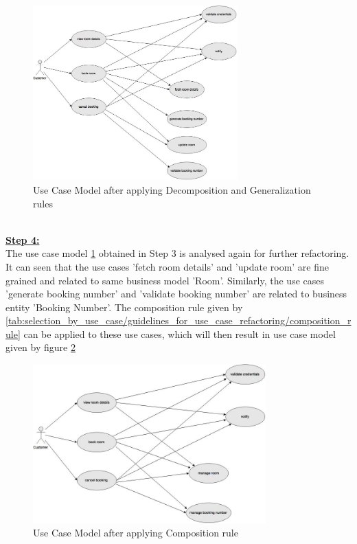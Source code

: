 \\
\begin{figure}[H]
\begin{center}
\includegraphics[width=0.7\textwidth]{figures/use-case-three}
\caption{Use Case Model after applying Decomposition and Generalization rules}
\label{fig:selection_by_use_case/use_case_three}
\end{center}
\end{figure}
\\
\textbf{\underline{Step 4:}}
\\
The use case model \ref{fig:selection_by_use_case/use_case_three} obtained in Step 3 is analysed again for further refactoring. It can seen that the use cases 'fetch room details' and 'update room' are fine grained and related to same business model 'Room'. Similarly, the use cases 'generate booking number' and 'validate booking number' are related to business entity 'Booking Number'. The composition rule given by \ref{tab:selection_by_use_case/guidelines_for_use_case_refactoring/composition_rule} can be applied to these use cases, which will then result in use case model given by figure \ref{fig:selection_by_use_case/use_case_four}
\\
\begin{figure}[H]
\begin{center}
\includegraphics[width=0.8\textwidth]{figures/use-case-four}
\caption{Use Case Model after applying Composition rule}
\label{fig:selection_by_use_case/use_case_four}
\end{center}
\end{figure}
